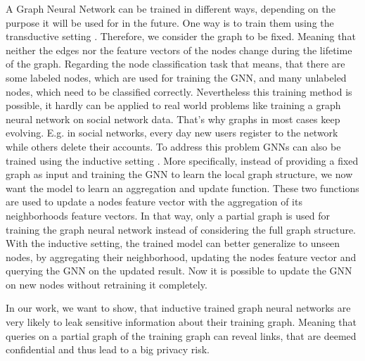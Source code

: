 		A Graph Neural Network can be trained in different ways, depending on the purpose it will be used for in the future.
		One way is to train them using the transductive setting \cite{5206871, ZHA2010187, WANG2017218, 10.1007/978-3-642-04174-7_29}.
		Therefore, we consider the graph to be fixed.
		Meaning that neither the edges nor the feature vectors of the nodes change during the lifetime of the graph.
		Regarding the node classification task that means, that there are some labeled nodes, which are used for training the GNN, and many unlabeled nodes, which need to be classified correctly.
		Nevertheless this training method is possible, it hardly can be applied to real world problems like training a graph neural network on social network data.
		That's why graphs in most cases keep evolving.
		E.g. in social networks, every day new users register to the network while others delete their accounts.
		To address this problem GNNs can also be trained using the inductive setting \cite{zeng2020graphsaint, 8519335, zhang2020document}.
		More specifically, instead of providing a fixed graph as input and training the GNN to learn the local graph structure, we now want the model to learn an aggregation and update function.
		These two functions are used to update a nodes feature vector with the aggregation of its neighborhoods feature vectors.
		In that way, only a partial graph is used for training the graph neural network instead of considering the full graph structure.
		With the inductive setting, the trained model can better generalize to unseen nodes, by aggregating their neighborhood, updating the nodes feature vector and querying the GNN on the updated result.
		Now it is possible to update the GNN on new nodes without retraining it completely.

		In our work, we want to show, that inductive trained graph neural networks are very likely to leak sensitive information about their training graph. 
		Meaning that queries on a partial graph of the training graph can reveal links, that are deemed confidential and thus lead to a big privacy risk.

